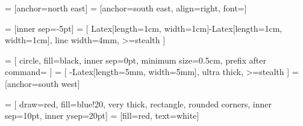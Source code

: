 
\usepackage{mwe}
\usepackage{blindtext}
\usepackage{relsize}
\usetikzlibrary{positioning	}
\usetikzlibrary{arrows.meta}
\usetikzlibrary{calc}


\newcommand{\macrotext}[1]{\color{macrocolor}#1}
\newcommand{\microtext}[1]{\color{microcolor}#1}
\newcommand{\black}[1]{\color{black}#1}

\newcommand{\FIGWIDTH}{17cm} %
\newcommand{\FIGHEIGHT}{12cm} %
\newcommand{\VERTFIGSEP}{4cm} %
\newcommand{\HORFIGSEP}{4cm} %
\newcommand{\BORDERWIDTH}{3mm} %
 = [anchor=north east]
 = [anchor=south east, align=right, font=\footnotesize]

 = [inner sep=-5pt]
 = [
		{Latex[length=1cm, width=1cm]}-{Latex[length=1cm, width=1cm]},
		line width=4mm,
		>=stealth
]

 = [
		circle,
		fill=black,
		inner sep=0pt,
		minimum size=0.5cm,
		prefix after command= {}
]
 = [
		-{Latex[length=5mm, width=5mm]},
		ultra thick,
		>=stealth
]
 = [anchor=south west]
\newcommand{\PPWIDTH}{2cm}
\newcommand{\PPHEIGHT}{2cm}

 = [
		draw=red,
		fill=blue!20,
		very thick,
    rectangle,
		rounded corners,
		inner sep=10pt,
		inner ysep=20pt]
 = [fill=red, text=white]

\newcommand{\xo}{\bigotimes}
\newcommand{\includedimensions}[1]{}
